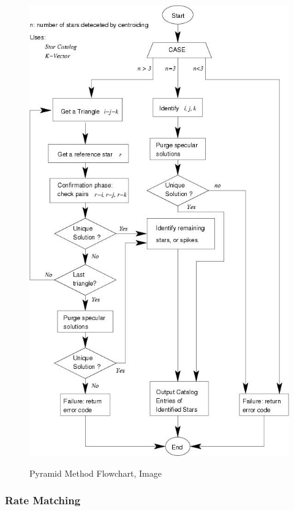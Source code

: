 \documentclass[12pt,a4paper,oneside]{article}
\begin{document}
\begin{figure}
\includegraphics[scale=0.6]{pyramid_method.jpg}
\centering
\label{fig:body_frame}
\caption{Pyramid Method Flowchart, Image \cite{mortari2004pyramid}}
\end{figure}

\cite{mortari2004pyramid}\par


\subsubsection{Rate Matching}
\cite{rao2005fast}
\end{document}
